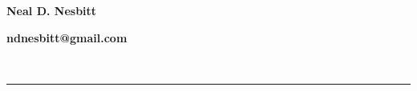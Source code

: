 \documentclass[10pt]{article}
\begin{document}
\noindent
\begin{minipage}[l]{0.58\textwidth}
    \color{Blue}\Huge \bf Neal D. Nesbitt
\end{minipage}
\hfill
\begin{minipage}[r]{0.38\textwidth}
    \raggedleft
    \textbf{ndnesbitt@gmail.com}\\
\end{minipage}\\

{\color{Orange}\hrule height 2pt width 0.75\textwidth}







\end{document}

